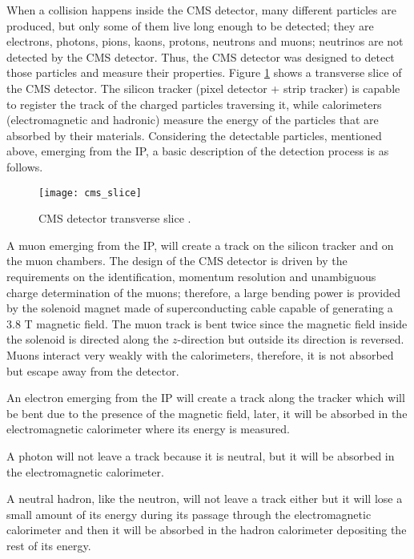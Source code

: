 When a \pp collision happens inside the CMS detector, many different particles are produced, but only some of them live long enough to be detected; they are electrons, photons, pions, kaons, protons, neutrons and muons; neutrinos are not detected by the CMS detector. Thus, the CMS detector was designed to detect those particles and measure their properties. Figure \ref{fig:cms_slice} shows a transverse slice of the CMS detector. The silicon tracker (pixel detector + strip tracker) is capable to register the track of the charged particles traversing it, while calorimeters (electromagnetic and hadronic) measure the energy of the particles that are absorbed by their materials. Considering the detectable particles, mentioned above, emerging from the IP, a basic description of the detection process is as follows. 

\begin{figure}[h!]
  \centering
  \texttt{[image: cms\_slice]}
  \caption[CMS detector transverse slice]{CMS detector transverse slice \cite{cms_slice}.}
  \label{fig:cms_slice}
\end{figure}

A muon emerging from the IP, will create a track on the silicon tracker and on the muon chambers. The design of the CMS detector is driven by the requirements on the identification, momentum resolution and unambiguous charge determination of the muons; therefore, a large bending power is provided by the solenoid magnet made of superconducting cable capable of generating a 3.8 T magnetic field. The muon track is bent twice since the magnetic field inside the solenoid is directed along the $z$-direction but outside its direction is reversed. Muons interact very weakly with the calorimeters, therefore, it is not absorbed but escape away from the detector.  

An electron emerging from the IP will create a track along the tracker which will be bent due to the presence of the magnetic field, later, it will be absorbed in the electromagnetic calorimeter where its energy is measured.

A photon will not leave a track because it is neutral, but it will be absorbed in the electromagnetic calorimeter.

A neutral hadron, like the neutron, will not leave a track either but it will lose a small amount of its energy during its passage through the electromagnetic calorimeter and then it will be absorbed in the hadron calorimeter depositing the rest of its energy.

